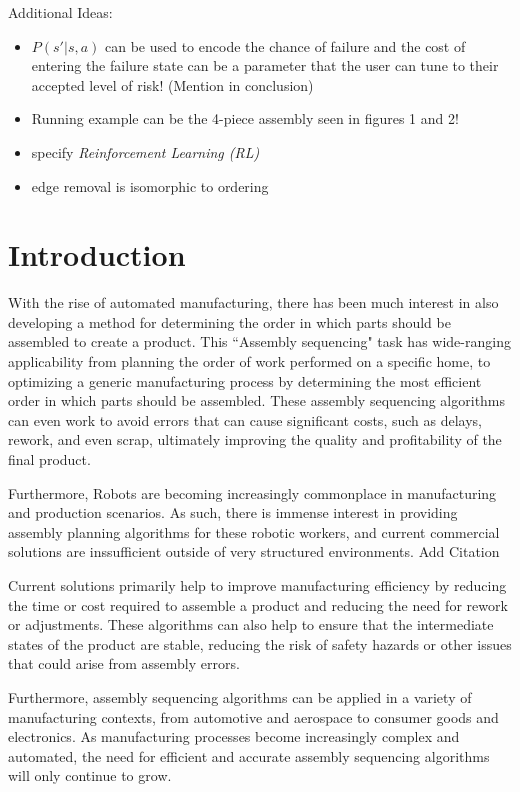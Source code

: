 \documentclass{article}
\begin{document}
Additional Ideas: 
\begin{itemize}
 \item $P(s'|s,a)$ can be used to encode the chance of failure and the cost of entering the failure state can be a parameter that the user can tune to their accepted level of risk! (Mention in conclusion)
 \item Running example can be the 4-piece assembly seen in figures 1 and 2!
 \item specify \emph{Reinforcement Learning (RL)}
 \item edge removal is isomorphic to ordering
\end{itemize}




\section{Introduction}

With the rise of automated manufacturing, there has been much interest in also developing a method for determining the order in which parts should be assembled to create a product. This ``Assembly sequencing" task has wide-ranging applicability from planning the order of work performed on a specific home, to optimizing a generic manufacturing process by determining the most efficient order in which parts should be assembled. These assembly sequencing algorithms can even work to avoid errors that can cause significant costs, such as delays, rework, and even scrap, ultimately improving the quality and profitability of the final product.

Furthermore, Robots are becoming increasingly commonplace in manufacturing and production scenarios. As such, there is immense interest in providing assembly planning algorithms for these robotic workers, and current commercial solutions are inssufficient outside of very structured environments. {\color{red} Add Citation}  

Current solutions primarily help to improve manufacturing efficiency by reducing the time or cost required to assemble a product and reducing the need for rework or adjustments. These algorithms can also help to ensure that the intermediate states of the product are stable, reducing the risk of safety hazards or other issues that could arise from assembly errors.

Furthermore, assembly sequencing algorithms can be applied in a variety of manufacturing contexts, from automotive and aerospace to consumer goods and electronics. As manufacturing processes become increasingly complex and automated, the need for efficient and accurate assembly sequencing algorithms will only continue to grow.
\end{document}
